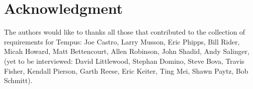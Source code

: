 
\section*{Acknowledgment}

The authors would like to thanks all those that contributed to the
collection of requirements for Tempus: Joe Castro, Larry Musson, Eric
Phipps, Bill Rider, Micah Howard, Matt Bettencourt, Allen Robinson,
John Shadid, Andy Salinger, (yet to be interviewed: David Littlewood,
Stephan Domino, Steve Bova, Travis Fisher, Kendall Pierson, Garth
Reese, Eric Keiter, Ting Mei, Shawn Paytz, Bob Schmitt). 
